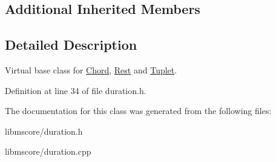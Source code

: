 \subsection*{Additional Inherited Members}


\subsection{Detailed Description}
Virtual base class for \hyperlink{class_ms_1_1_chord}{Chord}, \hyperlink{class_ms_1_1_rest}{Rest} and \hyperlink{class_ms_1_1_tuplet}{Tuplet}. 

Definition at line 34 of file duration.\+h.



The documentation for this class was generated from the following files\+:\begin{DoxyCompactItemize}
\item 
libmscore/duration.\+h\item 
libmscore/duration.\+cpp\end{DoxyCompactItemize}
